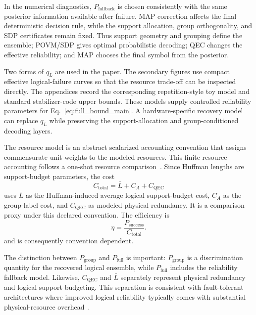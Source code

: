 In the numerical diagnostics, $P_{\mathrm{fallback}}$ is chosen consistently with the same posterior information available after failure. MAP correction affects the final deterministic decision rule, while the support allocation, group orthogonality, and SDP certificates remain fixed. Thus support geometry and grouping define the ensemble; POVM/SDP gives optimal probabilistic decoding; QEC changes the effective reliability; and MAP chooses the final symbol from the posterior.

Two forms of \(q_L\) are used in the paper. The secondary figures use compact effective logical-failure curves so that the resource trade-off can be inspected directly. The appendices record the corresponding repetition-style toy model and standard stabilizer-code upper bounds. These models supply controlled reliability parameters for Eq.~\eqref{eq:full_bound_main}. A hardware-specific recovery model can replace \(q_L\) while preserving the support-allocation and group-conditioned decoding layers.


\label{sec:resource_advantage}

The resource model is an abstract scalarized accounting convention that assigns commensurate unit weights to the modeled resources. This finite-resource accounting follows a one-shot resource comparison~\cite{tomamichel2013hierarchy,tomamichel2016finite}. Since Huffman lengths are support-budget parameters, the cost
\begin{equation}
    C_{\mathrm{total}}=\bar L+C_A+C_{\mathrm{QEC}}
    \label{eq:total_resource}
\end{equation}
uses $\bar L$ as the Huffman-induced average logical support-budget cost, $C_A$ as the group-label cost, and $C_{\mathrm{QEC}}$ as modeled physical redundancy. It is a comparison proxy under this declared convention. The efficiency is
\begin{equation}
    \eta=\frac{P_{\mathrm{success}}}{C_{\mathrm{total}}}.
    \label{eq:eta_main}
\end{equation}
and is consequently convention dependent.

The distinction between \(P_{\mathrm{group}}\) and \(P_{\mathrm{full}}\) is important: \(P_{\mathrm{group}}\) is a discrimination quantity for the recovered logical ensemble, while \(P_{\mathrm{full}}\) includes the reliability fallback model. Likewise, \(C_{\mathrm{QEC}}\) and \(\bar L\) separately represent physical redundancy and logical support budgeting. This separation is consistent with fault-tolerant architectures where improved logical reliability typically comes with substantial physical-resource overhead~\cite{fowler2012surface,campbell2017roads}.

